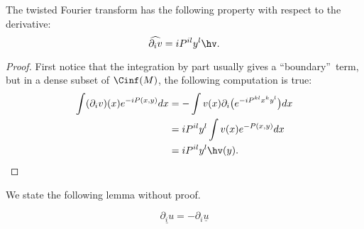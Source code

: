 \begin{lemma}
The twisted Fourier transform has the following property with respect to the derivative:
\[
        \widehat{\partial_iv}=iP^{il}y^l\hv.
\]
\end{lemma}
\begin{proof}
First notice that the integration by part usually gives a ``boundary''\ term, but in a dense subset of $\Cinf(M)$, the following computation is true:
\begin{equation}
\begin{split}
\int(\partial_iv)(x)e^{-iP(x,y)}dx&=-\int v(x)\partial_i\big(e^{-iP^{kl}x^ky^l}\big)dx\\
                            &=iP^{il}y^l\int v(x)e^{-P(x,y)}dx\\
                            &=iP^{il}y^l\hv(y).
\end{split}
\end{equation}
\end{proof}

We state the following lemma without proof.
\begin{lemma}
\[
            \underline{\partial_iu}=-\partial_i\underline{u}
\]
\end{lemma}

